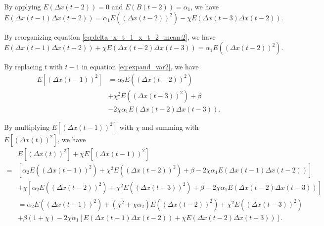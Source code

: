 \documentclass[12pt]{article}
\begin{document}
By applying $ E( \Delta x(t-2) ) = 0 $ and $ E( B(t-2) ) = \alpha_{1} $, we have
\begin{equation}
\label{eq:delta_x_t_1_x_t_2_mean:2}
E( \Delta x(t-1) \Delta x(t-2) ) = \alpha_{1} E( ( \Delta x(t-2) )^{2} ) - \chi E( \Delta x(t-3) \Delta x(t-2) ).
\end{equation}

By reorganizing equation \eqref{eq:delta_x_t_1_x_t_2_mean:2}, we have
\begin{equation}
\label{eq:delta_x_t_1_x_t_2_mean:3}
E( \Delta x(t-1) \Delta x(t-2) ) + \chi E( \Delta x(t-2) \Delta x(t-3) ) = \alpha_{1} E( ( \Delta x(t-2) )^{2} ) .
\end{equation}

By replacing $ t $ with $ t - 1 $ in equation \eqref{eq:expand_var2}, we have
\begin{equation}
\label{eq:expand_var3}
\begin{aligned}
E[ (\Delta x(t-1))^{2} ] & = \alpha_{2} E( ( \Delta x(t-2) )^{2} ) \\
& + \chi^{2} E( ( \Delta x(t-3) )^{2} ) + \beta \\
& - 2 \chi \alpha_{1} E( \Delta x(t-2) \Delta x(t-3) ).
\end{aligned}
\end{equation}

By multiplying $ E[ (\Delta x(t-1))^{2} ] $ with $ \chi $ and summing with $ E[ (\Delta x(t))^{2} ] $, we have
\begin{equation}
\label{eq:generate_minus}
\begin{aligned}
& E[ (\Delta x(t))^{2} ] + \chi E[ (\Delta x(t-1))^{2} ] \\
= & [ \alpha_{2} E( ( \Delta x(t-1) )^{2} ) + \chi^{2} E( ( \Delta x(t-2) )^{2} ) + \beta - 2 \chi \alpha_{1} E( \Delta x(t-1) \Delta x(t-2) ) ] \\
& + \chi [  \alpha_{2} E( ( \Delta x(t-2) )^{2} ) + \chi^{2} E( ( \Delta x(t-3) )^{2} ) + \beta - 2 \chi \alpha_{1} E( \Delta x(t-2) \Delta x(t-3) ) ] \\
& = \alpha_{2} E( ( \Delta x(t-1) )^{2} ) + ( \chi^{2} + \chi \alpha_{2} ) E( ( \Delta x(t-2) )^{2} ) + \chi^{2} E( ( \Delta x(t-3) )^{2} ) \\
& + \beta ( 1 + \chi ) - 2 \chi \alpha_{1} [ E( \Delta x(t-1) \Delta x(t-2) ) + \chi E( \Delta x(t-2) \Delta x(t-3) ) ].
\end{aligned}
\end{equation}
\end{document}
